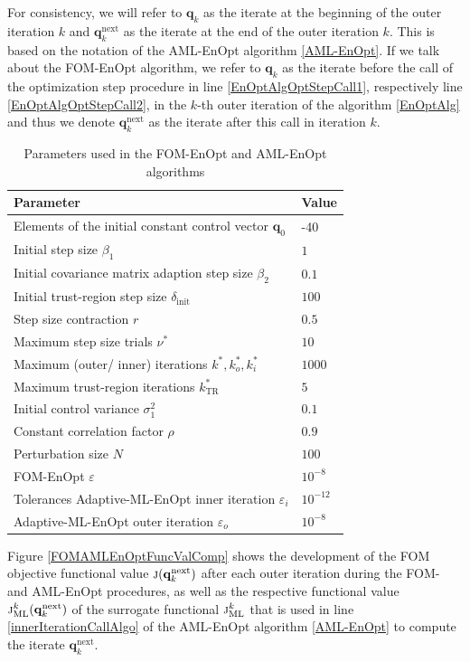 For consistency, we will refer to $\mathbf{q}_k$ as the iterate at the beginning of the outer iteration $k$ and $\mathbf{q}^\mathrm{next}_k$ as the iterate at the end of the outer iteration $k$. This is based on the notation of the AML-EnOpt algorithm \ref{AML-EnOpt}. If we talk about the FOM-EnOpt algorithm, we refer to $\mathbf{q}_k$ as the iterate before the call of the optimization step procedure in line \ref{EnOptAlgOptStepCall1}, respectively line \ref{EnOptAlgOptStepCall2}, in the $k$-th outer iteration of the algorithm \ref{EnOptAlg} and thus we denote $\mathbf{q}^\mathrm{next}_k$ as the iterate after this call in iteration $k$.

\begin{table}[h]
\caption{\label{FOMAMLEnOptParameters}Parameters used in the FOM-EnOpt and AML-EnOpt algorithms}
\centering
\begin{tabular}{ll}
\hline
Parameter & Value\\
\hline
Elements of the initial constant control vector $\mathbf{q}_0$ & -40\\
Initial step size $\beta_1$ & $1$\\
Initial covariance matrix adaption step size $\beta_2$ & $0.1$\\
Initial trust-region step size $\delta_\mathrm{init}$ & $100$\\
Step size contraction $r$ & $0.5$\\
Maximum step size trials $\nu^*$ & $10$\\
Maximum (outer/ inner) iterations $k^*, k^*_o, k^*_i$ & $1000$\\
Maximum trust-region iterations $k^*_\mathrm{TR}$ & $5$\\
Initial control variance $\sigma^2_1$ & $0.1$\\
Constant correlation factor $\rho$ & $0.9$\\
Perturbation size $N$ & $100$\\
FOM-EnOpt $\varepsilon$ & $10^{-8}$\\
Tolerances Adaptive-ML-EnOpt inner iteration $\varepsilon_i$ & $10^{-12}$\\
Adaptive-ML-EnOpt outer iteration $\varepsilon_o$ & $10^{-8}$\\
\hline
\end{tabular}
\end{table}

Figure \ref{FOMAMLEnOptFuncValComp} shows the development of the FOM objective functional value $\Call{j}{\mathbf{q}^\mathrm{next}_k}$ after each outer iteration during the FOM- and AML-EnOpt procedures, as well as the respective functional value $\Call{j$^k_\mathrm{ML}$}{\mathbf{q}^\mathrm{next}_k}$ of the surrogate functional $\textproc{j$_\mathrm{ML}^k$}$ that is used in line \ref{innerIterationCallAlgo} of the AML-EnOpt algorithm \ref{AML-EnOpt} to compute the iterate $\mathbf{q}^\mathrm{next}_k$.%


